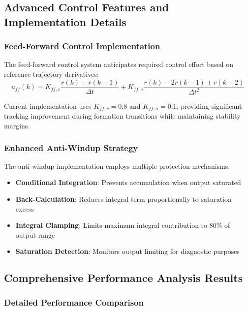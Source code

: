 \subsection*{Advanced Control Features and Implementation Details}

\subsubsection*{Feed-Forward Control Implementation}

The feed-forward control system anticipates required control effort based on reference trajectory derivatives:
\begin{equation}
u_{ff}(k) = K_{ff,v} \frac{r(k) - r(k-1)}{\Delta t} + K_{ff,a} \frac{r(k) - 2r(k-1) + r(k-2)}{\Delta t^2}
\end{equation}

Current implementation uses $K_{ff,v} = 0.8$ and $K_{ff,a} = 0.1$, providing significant tracking improvement during formation transitions while maintaining stability margins.

\subsubsection*{Enhanced Anti-Windup Strategy}

The anti-windup implementation employs multiple protection mechanisms:
\begin{itemize}
    \item \textbf{Conditional Integration}: Prevents accumulation when output saturated
    \item \textbf{Back-Calculation}: Reduces integral term proportionally to saturation excess
    \item \textbf{Integral Clamping}: Limits maximum integral contribution to 80\% of output range
    \item \textbf{Saturation Detection}: Monitors output limiting for diagnostic purposes
\end{itemize}

\subsection*{Comprehensive Performance Analysis Results}

\subsubsection*{Detailed Performance Comparison}

